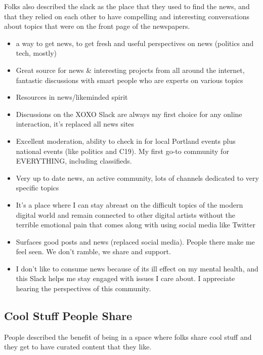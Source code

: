 \documentclass[
]{book}
\providecommand{\tightlist}{%
  \setlength{\itemsep}{0pt}\setlength{\parskip}{0pt}}
\begin{document}
Folks also described the slack as the place that they used to find the news, and that they relied on each other to have compelling and interesting conversations about topics that were on the front page of the newspapers.

\begin{itemize}
\tightlist
\item
  a way to get news, to get fresh and useful perspectives on news (politics and tech, mostly)
\item
  Great source for news \& interesting projects from all around the internet, fantastic discussions with smart people who are experts on various topics
\item
  Resources in news/likeminded spirit
\item
  Discussions on the XOXO Slack are always my first choice for any online interaction, it's replaced all news sites
\item
  Excellent moderation, ability to check in for local Portland events plus national events (like politics and C19). My first go-to community for EVERYTHING, including classifieds.
\item
  Very up to date news, an active community, lots of channels dedicated to very specific topics
\item
  It's a place where I can stay abreast on the difficult topics of the modern digital world and remain connected to other digital artists without the terrible emotional pain that comes along with using social media like Twitter
\item
  Surfaces good posts and news (replaced social media). People there make me feel seen. We don't ramble, we share and support.
\item
  I don't like to consume news because of its ill effect on my mental health, and this Slack helps me stay engaged with issues I care about. I appreciate hearing the perspectives of this community.
\end{itemize}

\subsection{Cool Stuff People Share}\label{cool-stuff-people-share}

People described the benefit of being in a space where folks share cool stuff and they get to have curated content that they like.
\end{document}
